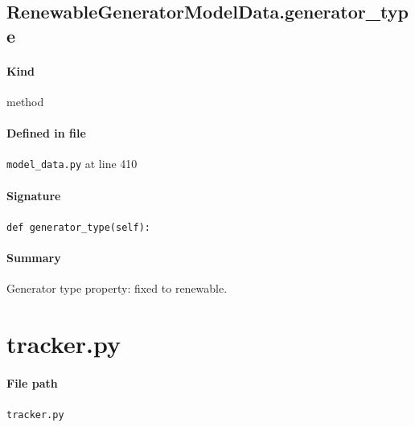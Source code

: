 \documentclass[11pt]{report}
\begin{document}
\subsection{RenewableGeneratorModelData.generator\_type}
\label{def:model_data.py:RenewableGeneratorModelData.generator_type:L410}
\paragraph{Kind} method
\paragraph{Defined in file} \texttt{model\_data.py} at line 410
\paragraph{Signature} \texttt{def generator\_type(self):}
\paragraph{Summary} Generator type property: fixed to renewable.

\section{tracker.py}
\label{file:tracker.py}
\paragraph{File path} \texttt{tracker.py}
\end{document}
